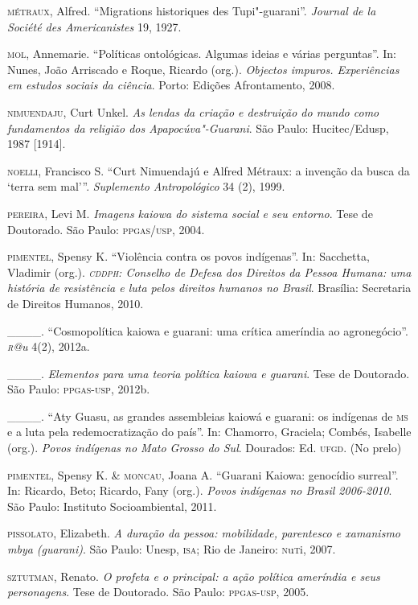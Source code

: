 \begin{Parskip}
\textsc{métraux}, Alfred. ``Migrations historiques des Tupi"-guarani''. \emph{Journal
de la Société des Americanistes} 19, 1927.

\textsc{mol}, Annemarie. ``Políticas ontológicas. Algumas ideias e várias
perguntas''. In: Nunes, João Arriscado e Roque, Ricardo (org.). \emph{Objectos
impuros. Experiências em estudos sociais da ciência}. Porto: Edições
Afrontamento, 2008.

\textsc{nimuendaju}, Curt Unkel. \emph{As lendas da criação e destruição do mundo
como fundamentos da religião dos Apapocúva"-Guarani}. São Paulo:
Hucitec/Edusp, 1987 [1914].

\textsc{noelli}, Francisco S. ``Curt Nimuendajú e Alfred Métraux: a invenção
da busca da `terra sem mal'''. \emph{Suplemento Antropológico} 34 (2), 1999. 

\textsc{pereira}, Levi M. \emph{Imagens kaiowa do sistema social e seu entorno}.
Tese de Doutorado. São Paulo: \textsc{ppgas}/\textsc{usp}, 2004.

\textsc{pimentel}, Spensy K. ``Violência contra os povos indígenas''. In:
Sacchetta, Vladimir (org.). \emph{\textsc{cddph}: Conselho de Defesa dos Direitos da
Pessoa Humana: uma história de resistência e luta pelos direitos
humanos no Brasil}. Brasília: Secretaria de Direitos Humanos, 2010.

\_\_\_\_. ``Cosmopolítica kaiowa e guarani: uma crítica ameríndia ao
agronegócio''. \emph{\textsc{r}@u} 4(2), 2012a.

\_\_\_\_. \emph{Elementos para uma teoria política kaiowa e guarani}. Tese
de Doutorado. São Paulo: \textsc{ppgas}-\textsc{usp}, 2012b. 

\_\_\_\_. ``Aty Guasu, as grandes assembleias kaiowá e guarani: os
indígenas de \textsc{ms} e a luta pela redemocratização do país''. In: Chamorro,
Graciela; Combés, Isabelle (org.). \emph{Povos indígenas no Mato Grosso do
Sul}. Dourados: Ed. \textsc{ufgd}. (No prelo)

\textsc{pimentel}, Spensy K. \& \textsc{moncau}, Joana A. ``Guarani Kaiowa: genocídio
surreal''. In: Ricardo, Beto; Ricardo, Fany (org.). \emph{Povos indígenas no
Brasil 2006-2010}. São Paulo: Instituto Socioambiental, 2011.

\textsc{pissolato}, Elizabeth. \emph{A duração da pessoa: mobilidade, parentesco
e xamanismo mbya (guarani)}. São Paulo: Unesp, \textsc{isa}; Rio de Janeiro:
\textsc{n}u\textsc{t}i, 2007.

\textsc{sztutman}, Renato. \emph{O profeta e o principal: a ação política
ameríndia e seus personagens}. Tese de Doutorado. São Paulo: \textsc{ppgas}-\textsc{usp},
2005.


\end{Parskip}
